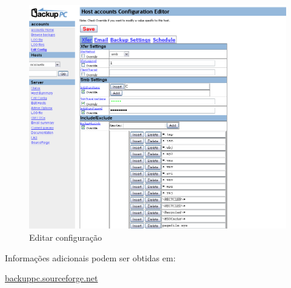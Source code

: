 \begin{figure}[H]
    \begin{center}
        \includegraphics[width=13cm]{include/img/backuppc_edit_config.png}
    \end{center}
    \caption{Editar configuração}
    \label{fig:backuppc_edit_config.png}
\end{figure}


Informações adicionais podem ser obtidas em:\\ \begin{normalsize}\sffamily\href{http://backuppc.sourceforge.net/}{backuppc.sourceforge.net}\end{normalsize}

